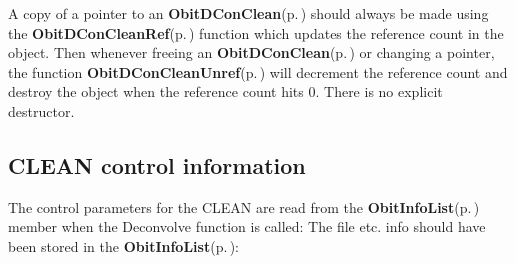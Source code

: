 A copy of a pointer to an {\bf Obit\-DCon\-Clean}{\rm (p.\,\pageref{structObitDConClean})} should always be made using the {\bf Obit\-DCon\-Clean\-Ref}{\rm (p.\,\pageref{ObitDConClean_8h_a1})} function which updates the reference count in the object. Then whenever freeing an {\bf Obit\-DCon\-Clean}{\rm (p.\,\pageref{structObitDConClean})} or changing a pointer, the function {\bf Obit\-DCon\-Clean\-Unref}{\rm (p.\,\pageref{ObitDConClean_8h_a0})} will decrement the reference count and destroy the object when the reference count hits 0. There is no explicit destructor. \subsection{CLEAN control information}\label{ObitDConClean_8h_ObitDConCleancontrol}
The control parameters for the CLEAN are read from the {\bf Obit\-Info\-List}{\rm (p.\,\pageref{structObitInfoList})} member when the Deconvolve function is called: The file etc. info should have been stored in the {\bf Obit\-Info\-List}{\rm (p.\,\pageref{structObitInfoList})}: \begin{itemize}

\end{itemize}
